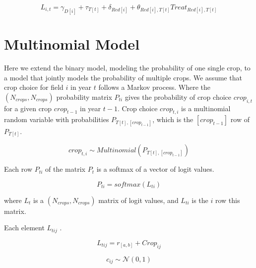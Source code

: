 \documentclass{article}
\begin{document}
\begin{equation}  
    L_{i,t} = \gamma_{D[i]} + \tau_{T[t]} + \delta_{Red[i]} + \theta_{Red[i],T[t]} Treat_{Red[i],T[t]}
\end{equation}




\section{Multinomial Model}


Here we extend the binary model, modeling the probability of one 
single crop, to a model that jointly models the probability of
multiple crops.
We assume that crop choice for field $i$ in year $t$ follows 
a Markov process. Where the $(N_{crops},N_{crops})$ probability 
matrix $P_{ti}$ gives the probability of crop choice $crop_{i,t}$
for a given crop $crop_{t-1}$ in year $t-1$. Crop choice
$crop_{t,i}$ is a multinomial random variable with 
probabilities $P_{T[t],[crop_{t-1}]}$, which is the $[crop_{t-1}]$ 
row of $P_{T[t]}$.

\begin{equation}  
    crop_{t,i} \sim Multinomial(P_{T[t],[crop_{t-1}]})
\end{equation}

Each row $P_{ti}$ of the matrix $P_{t}$
is a softmax of a vector of logit values. 

\begin{equation} 
    P_{ti} = softmax(L_{ti})
\end{equation}

where $L_{t}$ is a $(N_{crops},N_{crops})$ matrix of logit values,
and $L_{ti}$ is the $i$ row this matrix. 

Each element $L_{tij}$ .

\begin{equation} 
    L_{tij}  = r_{[a,b]} + Crop_{ij}
\end{equation}

\begin{equation} 
    c_{ij} \sim \mathcal{N}(0,1)
\end{equation}

 
\end{document}
